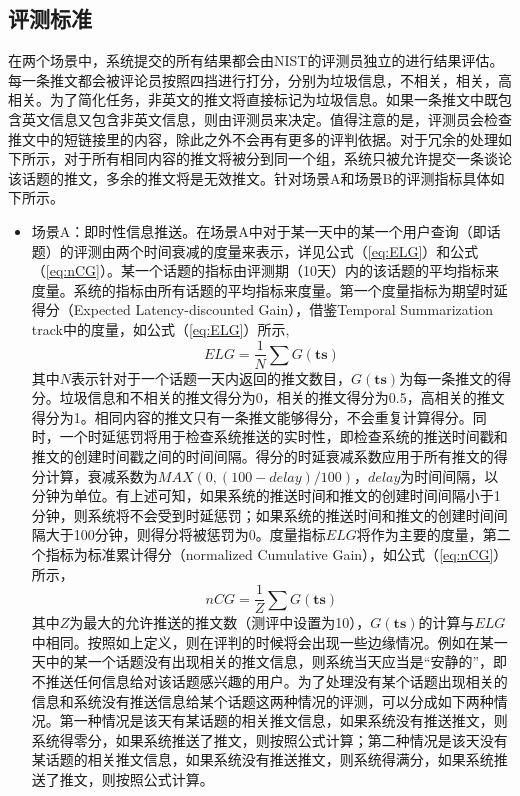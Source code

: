 \subsection{评测标准}
\label{subsec2:evalMetrics}
在两个场景中，系统提交的所有结果都会由NIST的评测员独立的进行结果评估。每一条推文都会被评论员按照四挡进行打分，分别为垃圾信息，不相关，相关，高相关。为了简化任务，非英文的推文将直接标记为垃圾信息。如果一条推文中既包含英文信息又包含非英文信息，则由评测员来决定。值得注意的是，评测员会检查推文中的短链接里的内容，除此之外不会再有更多的评判依据。对于冗余的处理如下所示，对于所有相同内容的推文将被分到同一个组，系统只被允许提交一条谈论该话题的推文，多余的推文将是无效推文。针对场景A和场景B的评测指标具体如下所示。
\begin{itemize}
  \item 场景A：即时性信息推送。在场景A中对于某一天中的某一个用户查询（即话题）的评测由两个时间衰减的度量来表示，详见公式（\ref{eq:ELG}）和公式（\ref{eq:nCG}）。某一个话题的指标由评测期（10天）内的该话题的平均指标来度量。系统的指标由所有话题的平均指标来度量。第一个度量指标为期望时延得分（Expected Latency-discounted Gain），借鉴Temporal Summarization track中的度量，如公式（\ref{eq:ELG}）所示,
  \begin{equation}
  \label{eq:ELG}
    ELG = \frac{1}{N}\sum {G\left( {\mathbf{ts}} \right)}
  \end{equation}
  其中$N$表示针对于一个话题一天内返回的推文数目，$G\left( {\mathbf{ts}} \right)$为每一条推文的得分。垃圾信息和不相关的推文得分为0，相关的推文得分为0.5，高相关的推文得分为1。相同内容的推文只有一条推文能够得分，不会重复计算得分。同时，一个时延惩罚将用于检查系统推送的实时性，即检查系统的推送时间戳和推文的创建时间戳之间的时间间隔。得分的时延衰减系数应用于所有推文的得分计算，衰减系数为$MAX\left( {0,\left( {100 - delay} \right)/100} \right)$，$delay$为时间间隔，以分钟为单位。有上述可知，如果系统的推送时间和推文的创建时间间隔小于1分钟，则系统将不会受到时延惩罚；如果系统的推送时间和推文的创建时间间隔大于100分钟，则得分将被惩罚为0。度量指标$ELG$将作为主要的度量，第二个指标为标准累计得分（normalized Cumulative Gain），如公式（\ref{eq:nCG}）所示，
  \begin{equation}
  \label{eq:nCG}
    nCG = \frac{1}{Z}\sum {G\left( {\mathbf{ts}} \right)}
  \end{equation}
  其中$Z$为最大的允许推送的推文数（测评中设置为10），$G\left( {\mathbf{ts}} \right)$的计算与$ELG$中相同。按照如上定义，则在评判的时候将会出现一些边缘情况。例如在某一天中的某一个话题没有出现相关的推文信息，则系统当天应当是“安静的”，即不推送任何信息给对该话题感兴趣的用户。为了处理没有某个话题出现相关的信息和系统没有推送信息给某个话题这两种情况的评测，可以分成如下两种情况。第一种情况是该天有某话题的相关推文信息，如果系统没有推送推文，则系统得零分，如果系统推送了推文，则按照公式计算；第二种情况是该天没有某话题的相关推文信息，如果系统没有推送推文，则系统得满分，如果系统推送了推文，则按照公式计算。

\end{itemize}
